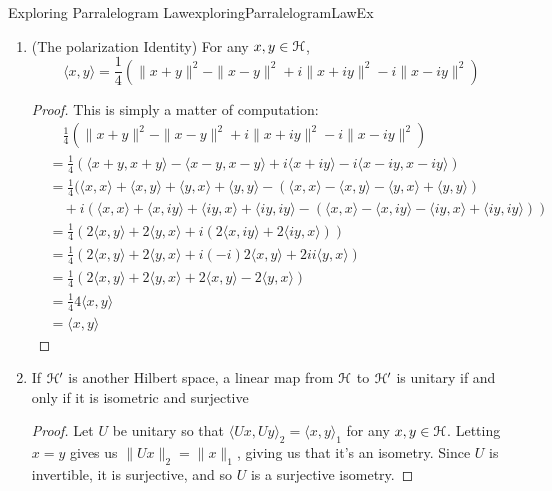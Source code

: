 \documentclass[oneside]{book}
\newcommand{\EH}{\EuScript{H}}
\begin{document}
\begin{example}{Exploring Parralelogram Law}{exploringParralelogramLawEx}
	\begin{enumerate}
		\item (The polarization Identity) For any $x,y \in \EH$,
			\[
				\langle x,y \rangle = \frac{1}{4}(\|x+y\|^2 - \|x-y\|^2 + i\|x+iy\|^2 - i\|x-iy\|^2)
			\]
			\begin{proof}
				This is simply a matter of computation:
				\begin{align*}
					&\quad \frac{1}{4}(\|x+y\|^2 - \|x-y\|^2 + i\|x+iy\|^2 - i\|x-iy\|^2)\\
					&= \frac{1}{4}(\langle x+y, x+y\rangle - \langle x-y, x-y\rangle + i\langle x + iy\rangle - i\langle x - iy, x- iy\rangle)\\
					&= \frac{1}{4}(\langle x, x\rangle + \langle x,y\rangle + \langle y,x\rangle + \langle
					y,y\rangle - (\langle x, x\rangle - \langle x,y\rangle - \langle y,x\rangle + \langle y,y\rangle)\\
					&\quad +  i(\langle x, x\rangle + \langle x,iy\rangle + \langle iy,x\rangle + \langle
					iy,iy\rangle - (\langle x, x\rangle - \langle x,iy\rangle - \langle iy,x\rangle + \langle
					iy,iy\rangle))\\
					&= \frac{1}{4}( 2\langle x,y\rangle + 2\langle y,x\rangle +  i( 2\langle x,iy\rangle +2 \langle iy,x\rangle))\\
					&= \frac{1}{4}( 2\langle x,y\rangle + 2\langle y,x\rangle +  i(-i)2\langle x,y\rangle +2 ii\langle y,x\rangle)\\
					&= \frac{1}{4}( 2\langle x,y\rangle + 2\langle y,x\rangle +  2\langle x,y\rangle -2 \langle y,x\rangle)\\
					&= \frac{1}{4}4\langle x,y\rangle\\
					&= \langle x,y\rangle
				\end{align*}
			\end{proof}
		\item If $\EH'$ is another Hilbert space, a linear map from $\EH$ to $\EH'$ is unitary if and only if it is
			isometric and surjective
			\begin{proof}
				Let $U$ be unitary so that $\langle Ux, Uy \rangle_2 = \langle x,y \rangle_1$ for any $x,y \in
				\EH$. Letting $x= y$ gives us $\|Ux\|_2 = \|x\|_1$, giving us that it's an isometry. Since $U$ is
				invertible, it is surjective, and so $U$ is a surjective isometry.


\end{proof}
\end{enumerate}
\end{example}
\end{document}
